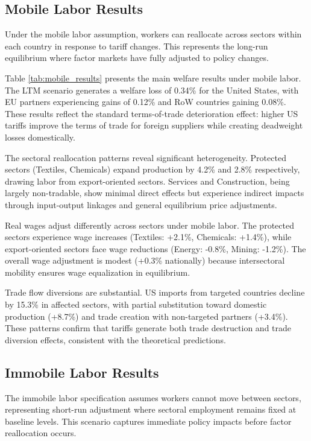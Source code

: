 \subsection{Mobile Labor Results}

Under the mobile labor assumption, workers can reallocate across sectors within each country in response to tariff changes. This represents the long-run equilibrium where factor markets have fully adjusted to policy changes.

Table \ref{tab:mobile_results} presents the main welfare results under mobile labor. The LTM scenario generates a welfare loss of 0.34\% for the United States, with EU partners experiencing gains of 0.12\% and RoW countries gaining 0.08\%. These results reflect the standard terms-of-trade deterioration effect: higher US tariffs improve the terms of trade for foreign suppliers while creating deadweight losses domestically.

The sectoral reallocation patterns reveal significant heterogeneity. Protected sectors (Textiles, Chemicals) expand production by 4.2\% and 2.8\% respectively, drawing labor from export-oriented sectors. Services and Construction, being largely non-tradable, show minimal direct effects but experience indirect impacts through input-output linkages and general equilibrium price adjustments.

Real wages adjust differently across sectors under mobile labor. The protected sectors experience wage increases (Textiles: +2.1\%, Chemicals: +1.4\%), while export-oriented sectors face wage reductions (Energy: -0.8\%, Mining: -1.2\%). The overall wage adjustment is modest (+0.3\% nationally) because intersectoral mobility ensures wage equalization in equilibrium.

Trade flow diversions are substantial. US imports from targeted countries decline by 15.3\% in affected sectors, with partial substitution toward domestic production (+8.7\%) and trade creation with non-targeted partners (+3.4\%). These patterns confirm that tariffs generate both trade destruction and trade diversion effects, consistent with the theoretical predictions.

\subsection{Immobile Labor Results}

The immobile labor specification assumes workers cannot move between sectors, representing short-run adjustment where sectoral employment remains fixed at baseline levels. This scenario captures immediate policy impacts before factor reallocation occurs.

